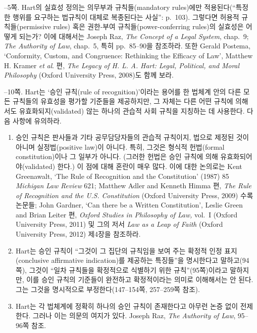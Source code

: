 {--5쪽.  Hart의 실효성 정의는
의무부과 규칙들(mandatory rules)에만 적용된다(“특정한 행위를 요구하는
법규칙이 대체로 복종된다는 사실”: p.~103). 그렇다면 허용적
규칙들(permissive rules) 혹은 권한-부여 규칙들(power-conferring rules)의
실효성은 어떻게 되는가? 이에 대해서는 Joseph Raz, \emph{The Concept of a
Legal System}, chap.~9; \emph{The Authority of Law}, chap.~5, 특히
pp.~85--90을 참조하라. 또한 Gerald Postema, `Conformity, Custom, and
Congruence: Rethinking the Efficacy of Law', Matthew H. Kramer \emph{et
al}. 편, \emph{The Legacy of H. L. A. Hart: Legal, Political, and Moral
Philosophy} (Oxford University Press, 2008)도 함께 보라.

--10쪽.  Hart는 ‘승인 규칙(rule of recognition)’이라는
용어를 한 법체계 안의 다른 모든 규칙들의 유효성을 평가할 기준들을
제공하지만, 그 자체는 다른 어떤 규칙에 의해서도 유효화되지(validated)
않는 하나의 관습적 사회 규칙을 지칭하는 데 사용한다. 다음 사항에
유의하라.

\begin{enumerate}
\def\labelenumi{(\arabic{enumi})}
\item
  승인 규칙은 판사들과 기타 공무담당자들의 관습적 규칙이지, 법으로
  제정된 것이 아니며 실정법(positive law)이 아니다. 특히, 그것은 형식적
  헌법(formal constitution)이나 그 일부가 아니다. (그러한 헌법은
   승인 규칙에 의해 유효화되어야(validated) 한다.) 이
  점에 대해 혼란이 매우 많다. 이에 대한 논의로는 Kent Greenawalt, `The
  Rule of Recognition and the Constitution' (1987) 85 \emph{Michigan Law
  Review} 621; Matthew Adler and Kenneth Himma 편, \emph{The Rule of
  Recognition and the U.S. Constitution} (Oxford University Press, 2009)
  수록 논문들; John Gardner, `Can there be a Written Constitution',
  Leslie Green and Brian Leiter 편, \emph{Oxford Studies in Philosophy
  of Law,} vol.~I (Oxford University Press, 2011) 및 그의 저서 \emph{Law
  as a Leap of Faith} (Oxford University Press, 2012) 제4장을 참조하라.
\item
  Hart는 승인 규칙이 “그것이 그 집단의 규칙임을 보여 주는 확정적 인정
  표지(conclusive affirmative indication)를 제공하는 특징들”을
  명시한다고 말하고(94쪽), 그것이 “일차 규칙들을 확정적으로 식별하기
  위한 규칙”(95쪽)이라고 말하지만, 이를 승인 규칙의 기준들이 완전하고
  확정적이라는 의미로 이해해서는 안 된다. 그는 그것을 명시적으로
  부정한다(147--154쪽, 257--259쪽 참조).
\item
  Hart는 각 법체계에 정확히 하나의 승인 규칙이 존재한다고 아무런 논증
  없이 전제한다. 그러나 이는 의문의 여지가 있다. Joseph Raz, \emph{The
  Authority of Law}, 95--96쪽 참조.
\end{enumerate}

}
